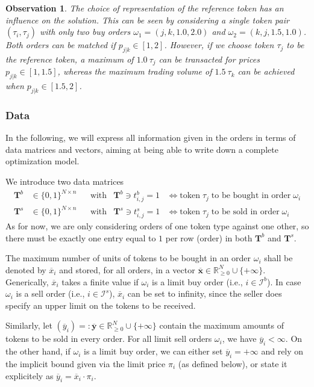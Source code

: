 \documentclass[11pt,parskip=full]{scrartcl}%
\newcommand*{\ie}{i.e., }
\newcommand*{\ibuyorders}{\mathcal{I}^b}    %
\newcommand*{\isellorders}{\mathcal{I}^s}   %
\newtheorem{observation}[theorem]{Observation}
\begin{document}
\vspace{.2cm}
\begin{observation}
The choice of representation of the reference token has an influence on the solution.
This can be seen by considering a single token pair $ (\tau_i,\tau_j) $ with only two buy orders
$ \omega_1 = (j,k,1.0,2.0) $ and $ \omega_2 = (k,j,1.5,1.0) $.
Both orders can be matched if $ p_{j|k} \in [1,2] $.
However, if we choose token $ \tau_j $ to be the reference token, a maximum of $ 1.0 \> \tau_j $
can be transacted for prices $ p_{j|k} \in [1,1.5] $, whereas the maximum trading volume of
$ 1.5 \> \tau_k $ can be achieved when $ p_{j|k} \in [1.5,2] $.
\end{observation}


\newpage
\subsubsection*{Data}

In the following, we will express all information given in the orders in terms of data
matrices and vectors, aiming at being able to write down a complete optimization model.

We introduce two data matrices
\begin{align*}
  \mathbf{T}^b &\in \{0,1\}^{N \times n} && \text{with} & \mathbf{T}^b \ni t^b_{i,j} = 1
  &\Leftrightarrow
  \text{token} \; \tau_j \; \text{to be bought in order} \; \omega_i \\
  \mathbf{T}^s &\in \{0,1\}^{N \times n} && \text{with} & \mathbf{T}^s \ni t^s_{i,j} = 1
  &\Leftrightarrow
  \text{token} \; \tau_j \; \text{to be sold in order} \; \omega_i
\end{align*}
As for now, we are only considering orders of one token type against one other, so there must be
exactly one entry equal to $ 1 $ per row (order) in both $ \mathbf{T}^b $ and $ \mathbf{T}^s $.

The maximum number of units of tokens to be bought in an order $ \omega_i $ shall be denoted by
$ \overline{x}_i $ and stored, for all orders, in a vector
$ \overline{\mathbf{x}} \in \mathbb{R}^N_{\ge 0} \cup \{+\infty\} $.
Generically, $ \overline{x}_i $ takes a finite value if $ \omega_i $ is a limit buy order
(\ie $ i \in \ibuyorders $).
In case $ \omega_i $ is a sell order (\ie $ i \in \isellorders $), $ \overline{x}_i $ can be set to
infinity, since the seller does specify an upper limit on the tokens to be received.

Similarly, let
$ (\overline{y}_i) =: \overline{\mathbf{y}} \in \mathbb{R}^N_{\ge 0} \cup \{+\infty\} $ contain the
maximum amounts of tokens to be sold in every order.
For all limit sell orders $ \omega_i $, we have $ \overline{y}_i < \infty $.
On the other hand, if $ \omega_i $ is a limit buy order, we can either set
$ \overline{y}_i = +\infty $ and rely on the implicit bound given via the limit price $ \pi_i $ (as
defined below), or state it explicitely as $ \overline{y}_i = \overline{x}_i \cdot \pi_i $.
\end{document}
